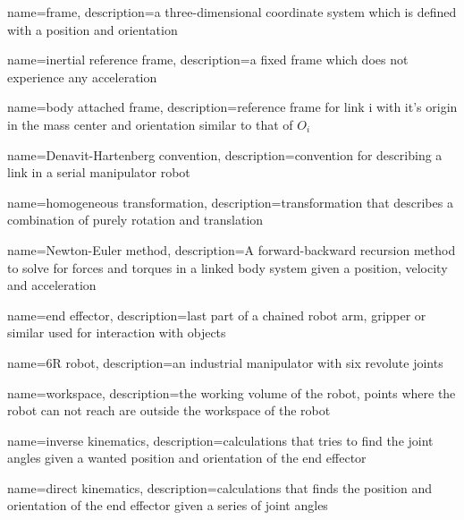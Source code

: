 \makeglossaries

{
    name={frame},
    description={a three-dimensional coordinate system which is defined with a position and orientation}
}

{
    name={inertial reference frame},
    description={a fixed frame which does not experience any acceleration}
}
 
 
{
    name={body attached frame},
    description={reference frame for link i with it's origin in the mass center and orientation similar to that of $O_i$}
}

{
    name={Denavit-Hartenberg convention},
    description={convention for describing a link in a serial manipulator robot}
}

{
    name={homogeneous transformation},
    description={transformation that describes a combination of purely rotation and translation}
}


{
    name={Newton-Euler method},
    description={A forward-backward recursion method to solve for forces and torques in a linked body system given a position, velocity and acceleration}
}

{
    name={end effector},
    description={last part of a chained robot arm, gripper or similar used for interaction with objects}
}

{
    name={6R robot},
    description={an industrial manipulator with six revolute joints}
}

{
    name={workspace},
    description={the working volume of the robot, points where the robot can not reach are outside the workspace of the robot}
}

{
    name={inverse kinematics},
    description={calculations that tries to find the joint angles given a wanted position and orientation of the end effector}
}


{
    name={direct kinematics},
    description={calculations that finds the position and orientation of the end effector given a series of joint angles}
}

